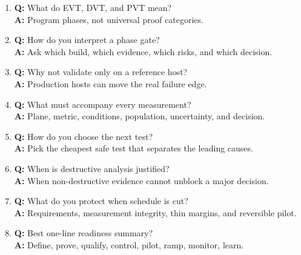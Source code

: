 \begin{enumerate}
\textbf{A:} It cannot replace missing earlier evidence.
\item \textbf{Q:} What do EVT, DVT, and PVT mean?\\
\textbf{A:} Program phases, not universal proof categories.
\item \textbf{Q:} How do you interpret a phase gate?\\
\textbf{A:} Ask which build, which evidence, which risks, and which decision.
\item \textbf{Q:} Why not validate only on a reference host?\\
\textbf{A:} Production hosts can move the real failure edge.
\item \textbf{Q:} What must accompany every measurement?\\
\textbf{A:} Plane, metric, conditions, population, uncertainty, and decision.
\item \textbf{Q:} How do you choose the next test?\\
\textbf{A:} Pick the cheapest safe test that separates the leading causes.
\item \textbf{Q:} When is destructive analysis justified?\\
\textbf{A:} When non-destructive evidence cannot unblock a major decision.
\item \textbf{Q:} What do you protect when schedule is cut?\\
\textbf{A:} Requirements, measurement integrity, thin margins, and reversible
pilot.
\item \textbf{Q:} Best one-line readiness summary?\\
\textbf{A:} Define, prove, qualify, control, pilot, ramp, monitor, learn.
\end{enumerate}


